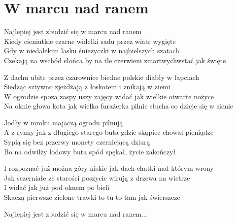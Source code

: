 \section{W marcu nad ranem}
\begin{text}
Najlepiej jest zbudzić się w marcu nad ranem\\
Kiedy cieniutkie czarne widełki sadu przez wiatr wygięte\\
Gdy w niedalekim lasku śnieżyczki w najbielszych szatach\\
Czekają na wschód słońca by na tle czerwieni zmartwychwstać jak święte

Z dachu ubite przez czarownice biedne polskie diabły w łapciach\\
Siedząc sztywno zjeżdżają z łoskotem i znikają w ziemi\\
W ogrodzie spoza zaspy uszy zajęcy widać jak wielkie otwarte nożyce\\
Na oknie głowa kota jak wielka furażerka pilnie słucha co dzieje się w sienie

Jodły w mroku majaczą ogrodu pilnują\\
A z rynny jak z długiego starego buta gdzie skąpiec chował pieniądze\\
Sypią się bez przerwy monety czerniejącą dziurą\\
Bo na odwilży lodowy buta spód spękał, życie zakończył

I rozpoznać już można góry niskie jak dach chatki nad którym wrony\\
Jak sczerniałe ze starości poszycie wirują z drzewa na wietrze\\
I widać jak już pod oknem po bieli\\
Skaczą pierwsze zielone trawki to tu to tam jak świerszcze

Najlepiej jest zbudzić się w marcu nad ranem...
\end{text}